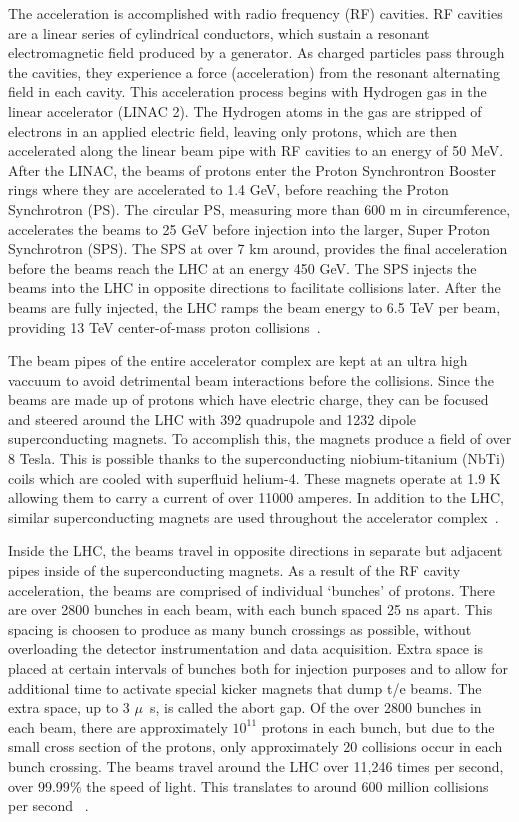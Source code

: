 The acceleration is accomplished with radio frequency (RF) cavities. RF cavities are a linear series of cylindrical conductors,
which sustain a resonant electromagnetic field produced by a generator. As 
charged particles pass through the cavities, they experience a force
(acceleration) from the resonant alternating field in each cavity. This acceleration process begins with Hydrogen gas in the linear accelerator
(LINAC 2). The Hydrogen atoms in the gas are stripped of electrons
in an applied electric field, leaving only protons, which are then accelerated
along the linear beam pipe with RF cavities to an energy of 50 MeV. After the LINAC, the beams of protons enter the Proton Synchrontron Booster rings where
they are accelerated to 1.4 GeV, before reaching the Proton
Synchrotron (PS). The circular PS, measuring more than 600 m
in circumference, accelerates the beams to 25 GeV before injection into the
larger, Super Proton Synchrotron (SPS). The SPS at over 7 km around, provides the final
acceleration before the beams reach the LHC at an energy 450 GeV. The SPS injects the beams into
the LHC in opposite directions to facilitate collisions later. After the beams are fully injected, the LHC ramps the beam energy to 6.5 TeV per beam, providing 13 TeV center-of-mass proton collisions~\cite{lhc_bluebook}.

The beam pipes of the entire accelerator complex are kept at an ultra high vaccuum
to avoid detrimental beam interactions before the collisions. Since the beams are made up of protons which have electric charge,
they can be focused and steered around the LHC with 392 quadrupole and 1232 dipole superconducting magnets.
To accomplish this, the magnets produce a field of over 8 Tesla. This is possible thanks to the
superconducting niobium-titanium (NbTi) coils which are cooled with superfluid helium-4. These
magnets operate at 1.9 K allowing them to carry a current of over 11000 amperes. In addition to
the LHC, similar superconducting magnets are used throughout the accelerator complex~\cite{lhc_bluebook}.

Inside the LHC, the beams travel in opposite directions in separate but adjacent pipes inside of the superconducting magnets.
As a result of the RF cavity acceleration, the beams are comprised of individual `bunches' of protons.
There are over 2800 bunches in each beam, with each bunch spaced 25 ns apart. This spacing is choosen to
produce as many bunch crossings as possible, without overloading
the detector instrumentation and data acquisition. Extra space is placed at certain intervals of bunches
both for injection purposes and to allow for additional time to activate special kicker magnets that dump t/e beams. The extra space, up to 3 $\mu$~s, is 
called the abort gap. Of the over 2800 bunches in each beam, there are approximately $10^{11}$ protons in each bunch, but due to the small cross section of the protons,
only approximately 20 collisions occur in each bunch crossing. The beams travel around the LHC over 11,246 times per second, over 99.99$\%$ the speed of light. 
This translates to around 600 million collisions per second ~\cite{lhc_bluebook}.

